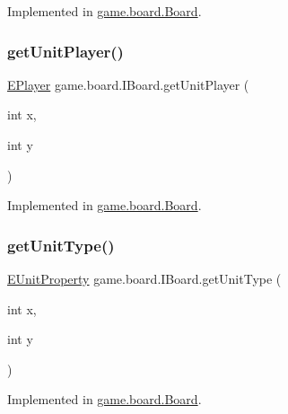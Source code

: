 Implemented in \mbox{\hyperlink{classgame_1_1board_1_1_board_a3c3b04d752eee7f25fcf2a57d0675374}{game.\+board.\+Board}}.

\mbox{\label{interfacegame_1_1board_1_1_i_board_a5f4d593eb6fcd82b36ddd8f629ceee03}} 
\subsubsection{\texorpdfstring{get\+Unit\+Player()}{getUnitPlayer()}}
{\footnotesize\ttfamily \mbox{\hyperlink{enumgame_1_1_e_player}{E\+Player}} game.\+board.\+I\+Board.\+get\+Unit\+Player (\begin{DoxyParamCaption}\item[{int}]{x,  }\item[{int}]{y }\end{DoxyParamCaption})}



Implemented in \mbox{\hyperlink{classgame_1_1board_1_1_board_a4290038dfff8b88ab1e95a96f5d083b9}{game.\+board.\+Board}}.

\mbox{\label{interfacegame_1_1board_1_1_i_board_a3454c1934e15ea532165597697e1f73d}} 
\subsubsection{\texorpdfstring{get\+Unit\+Type()}{getUnitType()}}
{\footnotesize\ttfamily \mbox{\hyperlink{enumrule_engine_1_1entity_1_1_e_unit_property}{E\+Unit\+Property}} game.\+board.\+I\+Board.\+get\+Unit\+Type (\begin{DoxyParamCaption}\item[{int}]{x,  }\item[{int}]{y }\end{DoxyParamCaption})}



Implemented in \mbox{\hyperlink{classgame_1_1board_1_1_board_a86eddc47b7951c2e74f9acfb5d8ad2e1}{game.\+board.\+Board}}.

